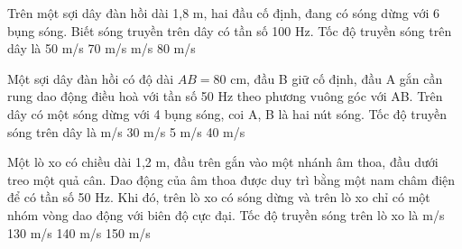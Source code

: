 \begin{ex}%
Trên một sợi dây đàn hồi dài 1,8 m, hai đầu cố định, đang có sóng dừng với 6 bụng sóng. Biết sóng truyền trên dây có tần số 100 Hz. Tốc độ truyền sóng trên dây là
\choice
{50 m/s}
{70 m/s}
{ m/s}
{80 m/s}
\end{ex} 
\begin{ex}%
Một sợi dây đàn hồi có độ dài $AB=80$ cm, đầu B giữ cố định, đầu A gắn cần rung dao động điều hoà với tần số 50 Hz theo phương vuông góc với AB. Trên dây có một sóng dừng với 4 bụng sóng, coi A, B là hai nút sóng. Tốc độ truyền sóng trên dây là
\choice
{ m/s}
{30 m/s}
{5 m/s}
{40 m/s}
\end{ex} 
\begin{ex}%
Một lò xo có chiều dài 1,2 m, đầu trên gắn vào một nhánh âm thoa, đầu dưới treo một quả cân. Dao động của âm thoa được duy trì bằng một nam châm điện để có tần số 50 Hz. Khi đó, trên lò xo có sóng dừng và trên lò xo chỉ có một nhóm vòng dao động với biên độ cực đại. Tốc độ truyền sóng trên lò xo là
\choice
{ m/s}
{130 m/s}
{140 m/s}
{150 m/s}
\end{ex} 


